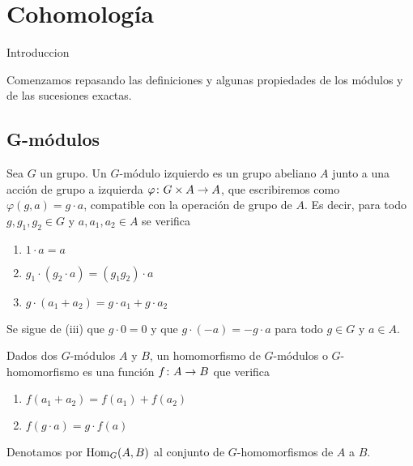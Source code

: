 
\chapter{Cohomología}

Introduccion 

Comenzamos repasando las definiciones y algunas propiedades de los módulos y de las sucesiones exactas.

\section{G-módulos}

\begin{definicion}
	Sea $G$ un grupo. Un $G$-módulo izquierdo es un grupo abeliano $A$ junto a una acción de grupo a izquierda $\varphi\colon G\times A\to A$, que escribiremos como $\varphi(g,a)=g\cdot a$, compatible con la operación de grupo de $A$. Es decir, para todo $g,g_1,g_2\in G$ y $a,a_1,a_2\in A$ se verifica
	\begin{enumerate}
		\item $1\cdot a=a$
		\item $g_1\cdot(g_2\cdot a)=(g_1g_2)\cdot a$
		\item $g\cdot (a_1+a_2)=g\cdot a_1+g\cdot a_2$
	\end{enumerate} 
	
	Se sigue de (iii) que $g\cdot 0 = 0$ y que $g\cdot (-a) = - g\cdot a$ para todo $g\in G$ y $a\in A$.
\end{definicion}

\begin{definicion}
	Dados dos $G$-módulos $A$ y $B$, un homomorfismo de $G$-módulos o $G$-homomorfismo es una función $f\colon A\to B$ que verifica
	\begin{enumerate}
		\item $f(a_1+a_2) = f(a_1)+f(a_2)$
		\item $f(g\cdot a) = g\cdot f(a)$
	\end{enumerate}
	
	Denotamos por $\operatorname{Hom}_G(A,B)$ al conjunto de $G$-homomorfismos de $A$ a $B$.
\end{definicion}



